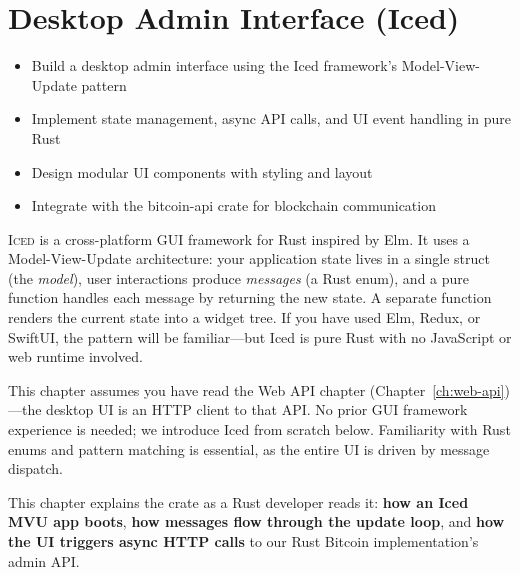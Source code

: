\chapter{Desktop Admin Interface (Iced)}
\label{ch:desktop-iced}

\begin{learnbox}
\begin{itemize}
  \item Build a desktop admin interface using the Iced framework's Model-View-Update pattern
  \item Implement state management, async API calls, and UI event handling in pure Rust
  \item Design modular UI components with styling and layout
  \item Integrate with the bitcoin-api crate for blockchain communication
\end{itemize}
\end{learnbox}

\lettrine{I}{ced} is a cross-platform GUI framework for Rust inspired by Elm. It uses a Model-View-Update architecture: your application state lives in a single struct (the \emph{model}), user interactions produce \emph{messages} (a Rust enum), and a pure  function handles each message by returning the new state. A separate  function renders the current state into a widget tree. If you have used Elm, Redux, or SwiftUI, the pattern will be familiar---but Iced is pure Rust with no JavaScript or web runtime involved.

\begin{notebox}[Prerequisites]
This chapter assumes you have read the Web API chapter (Chapter~\ref{ch:web-api})---the desktop UI is an HTTP client to that API. No prior GUI framework experience is needed; we introduce Iced from scratch below. Familiarity with Rust enums and pattern matching is essential, as the entire UI is driven by message dispatch.
\end{notebox}

This chapter explains the  crate as a Rust developer reads it: \textbf{how an Iced MVU app boots}, \textbf{how messages flow through the update loop}, and \textbf{how the UI triggers async HTTP calls} to our Rust Bitcoin implementation's admin API.

